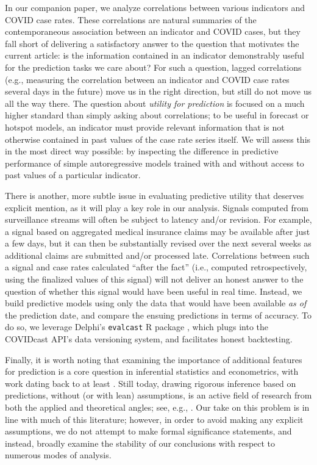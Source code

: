 \documentclass[9pt,twocolumn,twoside,lineno]{pnas-new}
\begin{document}
In our companion paper, we analyze correlations between various indicators and   
COVID case rates. These correlations are natural summaries of the
contemporaneous association between an indicator and COVID cases, but they fall 
short of delivering a satisfactory answer to the question that motivates the
current article: is the information contained in an indicator demonstrably
useful for the prediction tasks we care about? For such a question, lagged
correlations (e.g., measuring the correlation between an indicator and COVID
case rates several days in the future) move us in the right direction, but still
do not move us all the way there. The question about \textit{utility for 
  prediction} is focused on a much higher standard than simply asking 
about correlations; to be useful in forecast or hotspot models, an indicator
must provide relevant information that is not otherwise contained in past values
of the case rate series itself. We will assess this in the most direct way
possible: by inspecting the difference in predictive performance of simple
autoregressive models trained with and without access to past values of a
particular indicator.   

There is another, more subtle issue in evaluating predictive utility that 
deserves explicit mention, as it will play a key role in our analysis.
Signals computed from surveillance streams will often be subject to  
latency and/or revision. For example, a signal based on aggregated medical
insurance claims may be available after just a few days, but it can then be
substantially revised over the next several weeks as additional claims are
submitted and/or processed late. Correlations between such a signal and case
rates calculated ``after the fact'' (i.e., computed retrospectively, using the
finalized values of this signal) will not deliver an honest answer to the    
question of whether this signal would have been useful in real time. Instead,
we build predictive models using only the data that would have been available
\textit{as of} the prediction date, and compare the ensuing predictions in terms 
of accuracy. To do so, we leverage Delphi's \texttt{evalcast} R package 
\cite{EvalcastR}, which plugs into the COVIDcast API's data versioning system,  
and facilitates honest backtesting. 

Finally, it is worth noting that examining the importance of additional features
for prediction is a core question in inferential statistics and econometrics,
with work dating back to at least \cite{Granger:1969}. Still today, drawing
rigorous inference based on predictions, without (or with lean) assumptions, is
an active field of research from both the applied and theoretical angles;
see, e.g., \cite{Diebold:2002, McCraken:2007, Diebold:2015, Stokes:2017,
  Lei:2018, Rinaldo:2019, Williamsom:2020, Zhang:2020, Dai:2021, Fryer:2021}.
Our take on this problem is in line with much of this literature; however, in
order to avoid making any explicit assumptions, we do not attempt to make formal 
significance statements, and instead, broadly examine the stability of our
conclusions with respect to numerous modes of analysis.   
\end{document}
